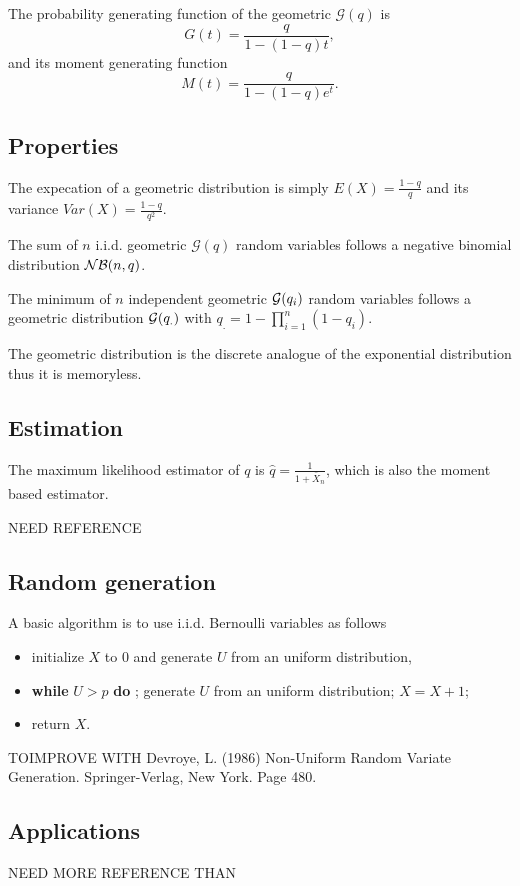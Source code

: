 The probability generating function of the geometric $\mathcal G(q)$ is
$$
G(t) = \frac{q}{1-(1-q)t},
$$ 
and its moment generating function 
$$
M(t) = \frac{q}{1-(1-q)e^t}.
$$

\subsection{Properties}
The expecation of a geometric distribution is simply $E(X)=\frac{1-q}{q}$ and its variance $Var(X)=\frac{1-q}{q^2}$.

The sum of $n$ i.i.d. geometric $\mathcal G(q)$ random variables follows a negative binomial distribution $\mathcal N\mathcal B(n,q)$.

The minimum of $n$ independent geometric $\mathcal G(q_i)$ random variables follows a geometric distribution $\mathcal G(q_.)$ with $q_. = 1-\prod_{i=1}^n (1-q_i)$. 

The geometric distribution is the discrete analogue of the exponential distribution thus it is memoryless. 

\subsection{Estimation}
The maximum likelihood estimator of $q$ is $\hat q = \frac{1}{1+\bar X_n}$, which is also the moment based estimator.

NEED REFERENCE



\subsection{Random generation}
A basic algorithm is to use i.i.d. Bernoulli variables as follows
\begin{itemize}
\item initialize $X$ to 0 and generate $U$ from an uniform distribution,
\item \textbf{while} $U>p$ \textbf{do} ; generate $U$ from an uniform distribution; $X=X+1$; 
\item return $X$.
\end{itemize}
TOIMPROVE WITH 
Devroye, L. (1986) Non-Uniform Random Variate Generation. Springer-Verlag, New York. Page 480. 

\subsection{Applications}
NEED MORE REFERENCE THAN \cite{macutek} 

